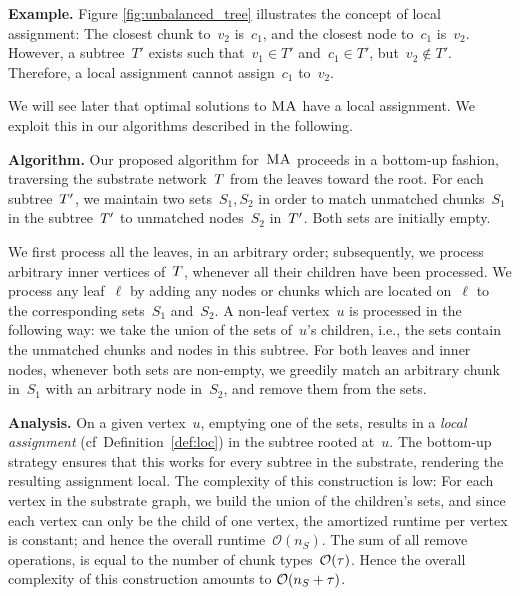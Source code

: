 \textbf{Example.}
Figure \ref{fig:unbalanced_tree} illustrates the concept of local assignment:
The closest chunk to~$v_2$ is~$c_1$, and the closest node to~$c_1$ is~$v_2$.
However, a subtree~$T'$ exists such that~$v_1 \in T'$ and~$c_1
\in T'$, but~$v_2 \notin T'$. Therefore, a local assignment cannot assign~$c_1$ to~$v_2$.


We will see later that
optimal solutions to
$\textsc{MA}$ have a local assignment. We exploit this in our algorithms described
in the following.

\textbf{Algorithm.} Our proposed algorithm for~$\textsc{MA}$
proceeds in a bottom-up fashion, traversing the substrate network~$T$
from the leaves toward the root.
For each subtree~$T'$, we maintain
two sets~$S_1,S_2$ in order to match unmatched
chunks~$S_1$ in the subtree~$T'$ to unmatched
nodes~$S_2$ in~$T'$. Both sets are initially empty.

We first process all the leaves, in an arbitrary order; subsequently, we process arbitrary inner vertices
of~$T$, whenever all their children have been processed.
We process any leaf~$\ell$
by adding any
nodes or chunks which are located on~$\ell$ to the corresponding sets~$S_1$ and~$S_2$.
A non-leaf vertex~$u$ is processed in the following way: we take the union of
the sets of~$u$'s children, i.e., the sets contain the unmatched chunks and nodes
in this subtree.
For both leaves and inner nodes, whenever
both sets are non-empty, we greedily match an arbitrary chunk in~$S_1$ with an arbitrary node in~$S_2$,
and remove them from the sets.

\textbf{Analysis.} On a given vertex~$u$, emptying one of the sets, results in a \emph{local assignment} (cf~Definition~\ref{def:loc})
in the
subtree rooted at~$u$. The bottom-up strategy ensures that this works
for every subtree in the substrate, rendering the resulting assignment
local.
The complexity of this
construction is low: For each
vertex in the substrate graph,
we build the union of the
children's sets,
and since each vertex can only be the child of one vertex,
the amortized runtime per vertex is constant; and hence the overall
runtime~$\mathcal{O}(n_S)$. The sum of all remove operations, is equal to
the number of chunk types~$\mathcal{O}(\tau)$.
Hence the overall complexity of this construction amounts to
$\mathcal{O}(n_S + \tau)$.

